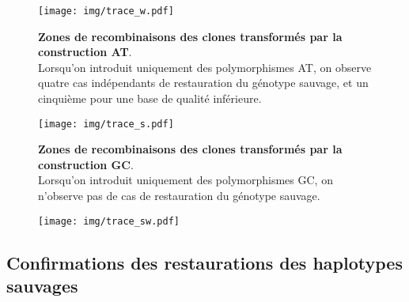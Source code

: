 \begin{figure}[p]%
  \begin{leftfullpage}
    \texttt{[image: img/trace\_w.pdf]}
    \caption[Zones de recombinaison des clones transformés par la construction
    AT]{\label{fig:tracew}\textbf{Zones de recombinaisons des clones transformés
        par la construction AT}. \\
      \rmfamily Lorsqu'on introduit uniquement des
      polymorphismes AT, on observe quatre cas indépendants de restauration du
      génotype sauvage, et un cinquième pour une base de qualité inférieure. }
  \end{leftfullpage}
\end{figure}
\begin{figure}[p]%
  \begin{fullpage}
    \texttt{[image: img/trace\_s.pdf]}
    \caption[Zones de recombinaisons des clones transformés par la construction
    GC]{\label{fig:traces} \textbf{Zones de recombinaisons des clones
        transformés par la construction GC}. \\
      \rmfamily Lorsqu'on introduit uniquement des polymorphismes GC, on n'observe pas de
      cas de restauration du génotype sauvage. }
  \end{fullpage}
\end{figure}
\begin{figure}[p]%
  \begin{leftfullpage}
    \texttt{[image: img/trace\_sw.pdf]}
    \caption[Zones de recombinaisons des clones transformés par la construction
    AT/GC]{\label{fig:tracesw} }
  \end{leftfullpage}
\end{figure}

\subsection{Confirmations des restaurations des haplotypes sauvages}
\label{subsec:confirm-haplotype}


